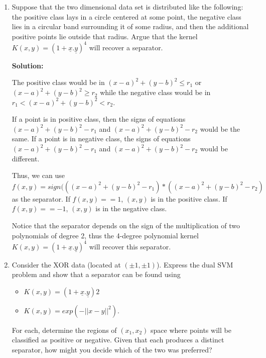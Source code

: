 \documentclass[letter, 12pt]{article}
\begin{document}
\begin{enumerate}
    	\item{Suppose that the two dimensional data set is distributed like the following: the positive class lays in a circle centered at some point, the negative class lies in a circular band surrounding it of some radius, and then the additional positive points lie outside that radius. Argue that the kernel $ K(x, y) = (1 + \underline{x}.\underline{y})^4 $ will recover a separator.}
    	\par{\textbf{Solution:}}
    	\par{The positive class would be in $ (x - a)^2 + (y - b)^2 \le r_1 $ or $ (x - a)^2 + (y - b)^2 \ge r_2 $ while the negative class would be in $ r_1 < (x - a)^2 + (y - b)^2 < r_2 $.}
    	\par{If a point is in positive class, then the signs of equations $ (x - a)^2 + (y - b)^2 - r_1 $ and $ (x - a)^2 + (y - b)^2 - r_2 $ would be the same. If a point is in negative class, the signs of equations $ (x - a)^2 + (y - b)^2 - r_1 $ and $ (x - a)^2 + (y - b)^2 - r_2 $ would be different.}
    	\par{Thus, we can use $ f(x, y) = sign(((x - a)^2 + (y - b)^2 - r_1) * ((x - a)^2 + (y - b)^2 - r_2) $ as the separator. If $ f(x, y) == 1 $, $ (x, y) $ is in the positive class. If $ f(x, y) == -1 $, $ (x, y) $ is in the negative class.}
    	\par{Notice that the separator depends on the sign of the multiplication of two polynomials of degree 2, thus the 4-degree polynomial kernel $ K(x, y) = (1 + \underline{x}.\underline{y})^4 $ will recover this separator.}
    	
    	\item{Consider the XOR data (located at $ (\pm1, \pm1) $). Express the dual SVM problem and show that a separator can be found using
    		\begin{itemize}
    			\item{$ K(x, y) = (1 + \underline{x}.\underline{y}) 2 $}
    			\item{$ K(x, y) = exp(-||x - y||^2 ). $}
    	\end{itemize}
    		For each, determine the regions of $ (x_1 , x_2 ) $ space where points will be classified as positive or negative. Given
    		that each produces a distinct separator, how might you decide which of the two was preferred?
    	}
    	
    \end{enumerate}
\end{document}
